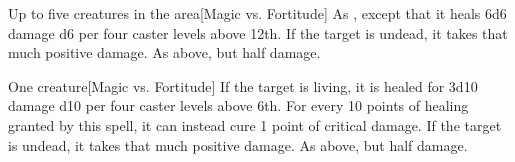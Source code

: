 \begin{spellheader}
\end{spellheader}
\begin{spelleffects}
    \begin{spelltargets}{Up to five creatures in the area}[Magic vs. Fortitude]
        \spelleffect As , except that it heals 6d6 damage \add d6 per four caster levels above 12th.
        \spellsuccess If the target is undead, it takes that much positive damage.
        \spellfailure As above, but half damage.
    \end{spelltargets}
\end{spelleffects}
\begin{spellfooter}
    
\end{spellfooter}

\begin{spellheader}
    \spellrng{\rngclose}
\end{spellheader}
\begin{spelleffects}
    \begin{spelltarget}{One creature}[Magic vs. Fortitude]
        \spelleffect If the target is living, it is healed for 3d10 damage \add d10 per four caster levels above 6th. For every 10 points of healing granted by this spell, it can instead cure 1 point of critical damage.
        \spellsuccess If the target is undead, it takes that much positive damage.
        \spellfailure As above, but half damage.
    \end{spelltarget}
\end{spelleffects}
\begin{spellfooter}
    
\end{spellfooter}

